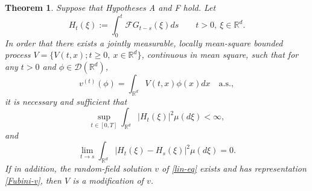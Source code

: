 \documentclass[12pt]{article}
\newtheorem{theorem}{Theorem}[section]
\def\cD{\mathcal{D}}
\def\cF{\mathcal{F}}
\def\bR{\mathbb{R}}
\begin{document}
\begin{theorem}
Suppose that Hypotheses A and F hold.
Let
\[
H_t(\xi):=\int_0^t \cF G_{t-s}(\xi)ds %
\qquad t>0,\ \xi\in \bR^d.
\]
In order that there exists a jointly measurable, locally mean-square bounded process
$V=\{V(t,x);t\geq 0,\ x\in \bR^d\}$, continuous in mean square, such that for any $t>0$ and $\phi \in \cD(\bR^d)$,
\begin{equation}
\label{v-V}
v^{(t)}(\phi)=\int_{\bR^d}V(t,x)\phi(x)dx
\quad  \mbox{a.s.},
\end{equation}
it is necessary and sufficient that
\begin{equation}
\label{cond1}
\sup_{t \in [0,T]}\int_{\bR^d}|H_t(\xi)|^2\mu(d\xi)<\infty,
\end{equation}
and
\begin{equation}
\label{cond2}
\lim_{t\to s}\int_{\bR^d}|H_t(\xi)-H_s(\xi)|^2\mu(d\xi)= 0.
\end{equation}
If in addition, the random-field solution $v$ of \eqref{lin-eq} exists and has representation \eqref{Fubini-v},
then $V$ is a modification of $v$.
\end{theorem}
\end{document}
